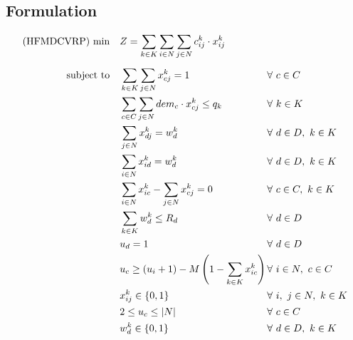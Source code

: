 \documentclass[preprint,review,12pt]{elsarticle}
\begin{document}
\subsection{Formulation}

\begin{align}
    \text{(HFMDCVRP) min} \quad        & Z = \sum\limits_{k\in K}\sum\limits_{i\in N}\sum\limits_{j\in N} c_{ij}^k \cdot x_{ij}^k    && \label{MDMVRP_FObj}    \\[5pt]
	\noindent \text{subject to} \quad & \sum\limits_{k \in K}\sum\limits_{j \in N} x_{cj}^k = 1                       && \text{\hspace{-1cm}} \forall \ c \in C \label{MDMVRP_Service} \\
	& \sum\limits_{c \in C}\sum\limits_{j \in N}dem_c \cdot x_{cj}^k \leq q_k               && \text{\hspace{-1cm}} \forall \ k \in K  \label{MDMVRP_Capacity} \\
	& \sum\limits_{j \in N}x_{dj}^k = w_d^k                                         && \text{\hspace{-1cm}} \forall \ d \in D,\ k \in K \label{MDMVRP_StartRoute} \\
	& \sum\limits_{i \in N}x_{id}^k = w_d^k                                         && \text{\hspace{-1cm}} \forall \ d \in D,\ k \in K \label{MDMVRP_EndRoute} \\
	& \sum\limits_{i \in N}x_{ic}^k - \sum\limits_{j \in N}x_{cj}^k = 0             && \text{\hspace{-1cm}} \forall \ c \in C,\ k \in K \label{MDMVRP_Balance} \\
	& \sum\limits_{k \in K}w_d^k \leq R_d                                     && \text{\hspace{-1cm}} \forall \ d \in D \label{MDMVRP_CapacityD} \\
	& u_d = 1                                                                       && \text{\hspace{-1cm}} \forall \ d \in D \label{MDMVRP_InitialU}\\
	& u_c \geq (u_i + 1) - M \left(1 - \sum\limits_{k \in K}x_{ic}^k \right) \qquad && \text{\hspace{-1cm}} \forall \ i \in N,\ c \in C \label{MDMVRP_OrderU}\\
	& x_{ij}^k \in\{0,1\}                                                           && \text{\hspace{-1cm}} \forall \ i, \ j \in N,\ k \in K \label{MDMVRP_DomainX}\\
	& 2 \leq u_c \leq |N|                                                           && \text{\hspace{-1cm}} \forall \ c \in C \label{MDVMRP_DomainU} \\
	& w_d^k  \in\{0,1\}                                                             && \text{\hspace{-1cm}} \forall \ d \in D, \ k \in K \label{MDVMRP_DomainW}
\end{align}
\end{document}

